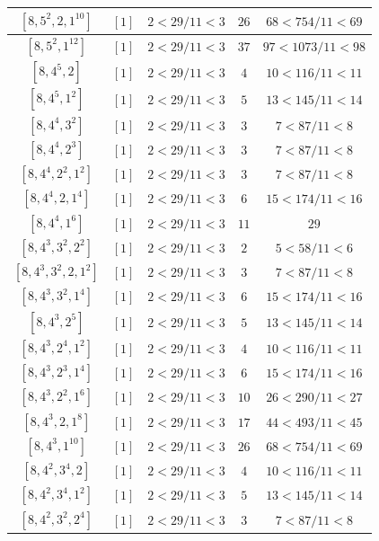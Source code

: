 \documentclass{article}%
\begin{document}
\begin{center}
\begin{longtable}{||c|c|c|c|c||}
$[8, 5^{2}, 2, 1^{10}]$ & $[1]$ & $2 < 29/11 < 3$ & $26$ & $68 < 754/11 < 69$ \\ \hline 
$[8, 5^{2}, 1^{12}]$ & $[1]$ & $2 < 29/11 < 3$ & $37$ & $97 < 1073/11 < 98$ \\ \hline 
$[8, 4^{5}, 2]$ & $[1]$ & $2 < 29/11 < 3$ & $4$ & $10 < 116/11 < 11$ \\ \hline 
$[8, 4^{5}, 1^{2}]$ & $[1]$ & $2 < 29/11 < 3$ & $5$ & $13 < 145/11 < 14$ \\ \hline 
$[8, 4^{4}, 3^{2}]$ & $[1]$ & $2 < 29/11 < 3$ & $3$ & $7 < 87/11 < 8$ \\ \hline 
$[8, 4^{4}, 2^{3}]$ & $[1]$ & $2 < 29/11 < 3$ & $3$ & $7 < 87/11 < 8$ \\ \hline 
$[8, 4^{4}, 2^{2}, 1^{2}]$ & $[1]$ & $2 < 29/11 < 3$ & $3$ & $7 < 87/11 < 8$ \\ \hline 
$[8, 4^{4}, 2, 1^{4}]$ & $[1]$ & $2 < 29/11 < 3$ & $6$ & $15 < 174/11 < 16$ \\ \hline 
$[8, 4^{4}, 1^{6}]$ & $[1]$ & $2 < 29/11 < 3$ & $11$ & $29$ \\ \hline 
$[8, 4^{3}, 3^{2}, 2^{2}]$ & $[1]$ & $2 < 29/11 < 3$ & $2$ & $5 < 58/11 < 6$ \\ \hline 
$[8, 4^{3}, 3^{2}, 2, 1^{2}]$ & $[1]$ & $2 < 29/11 < 3$ & $3$ & $7 < 87/11 < 8$ \\ \hline 
$[8, 4^{3}, 3^{2}, 1^{4}]$ & $[1]$ & $2 < 29/11 < 3$ & $6$ & $15 < 174/11 < 16$ \\ \hline 
$[8, 4^{3}, 2^{5}]$ & $[1]$ & $2 < 29/11 < 3$ & $5$ & $13 < 145/11 < 14$ \\ \hline 
$[8, 4^{3}, 2^{4}, 1^{2}]$ & $[1]$ & $2 < 29/11 < 3$ & $4$ & $10 < 116/11 < 11$ \\ \hline 
$[8, 4^{3}, 2^{3}, 1^{4}]$ & $[1]$ & $2 < 29/11 < 3$ & $6$ & $15 < 174/11 < 16$ \\ \hline 
$[8, 4^{3}, 2^{2}, 1^{6}]$ & $[1]$ & $2 < 29/11 < 3$ & $10$ & $26 < 290/11 < 27$ \\ \hline 
$[8, 4^{3}, 2, 1^{8}]$ & $[1]$ & $2 < 29/11 < 3$ & $17$ & $44 < 493/11 < 45$ \\ \hline 
$[8, 4^{3}, 1^{10}]$ & $[1]$ & $2 < 29/11 < 3$ & $26$ & $68 < 754/11 < 69$ \\ \hline 
$[8, 4^{2}, 3^{4}, 2]$ & $[1]$ & $2 < 29/11 < 3$ & $4$ & $10 < 116/11 < 11$ \\ \hline 
$[8, 4^{2}, 3^{4}, 1^{2}]$ & $[1]$ & $2 < 29/11 < 3$ & $5$ & $13 < 145/11 < 14$ \\ \hline 
$[8, 4^{2}, 3^{2}, 2^{4}]$ & $[1]$ & $2 < 29/11 < 3$ & $3$ & $7 < 87/11 < 8$ \\ \hline 

\end{longtable}
\end{center}
\end{document}
